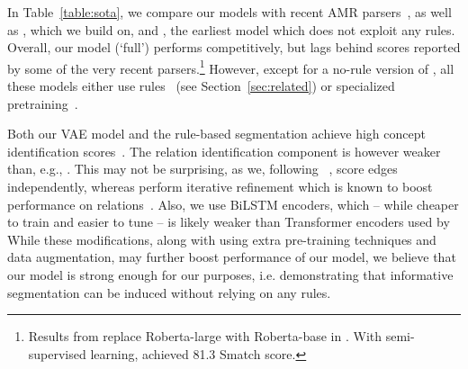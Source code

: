 \documentclass[11pt]{article}
\begin{document}
\vspace{1ex}
   \quad
In Table~\ref{table:sota}, we compare our models with recent AMR parsers~\cite{xu-etal-2020-improving,Cai2020AMRPV,cai-lam-2019-core,Zhang2019AMRPA,Naseem2019RewardingST,Lindemann2020FastSP,Lee2020PushingTL}, as well as \cite{lyu-titov-2018-amr}, which we build on, and \cite{Noord2017NeuralSP}, the earliest model which does not exploit any rules.  Overall, our model (`full') performs competitively, but lags behind scores reported by some of the very recent parsers.\footnote{Results from \citeauthor{Lee2020PushingTL} replace Roberta-large with Roberta-base in \citeauthor{Astudillo2020TransitionbasedPW}. With semi-supervised learning,  achieved 81.3 Smatch score. } However, except for a no-rule version of , all these models either use rules~\cite{Lee2020PushingTL} (see Section~\ref{sec:related}) or specialized pretraining~\cite{xu-etal-2020-improving}. 

 
Both our VAE model and the rule-based segmentation achieve high concept identification scores~\cite{Damonte2017AnIP}.
The relation identification component is however weaker than, e.g., \cite{Cai2020AMRPV}. This may not be surprising, as  we, following ~, score edges independently, whereas \cite{Cai2020AMRPV} perform iterative refinement which is known to boost performance on relations~\cite{lyu-etal-2019-semantic}.  Also, we use BiLSTM encoders, which -- while cheaper to train and easier to tune --
is likely weaker than Transformer encoders used by \citeauthor{Astudillo2020TransitionbasedPW,Lee2020PushingTL} 
While these modifications, along with using extra pre-training techniques and data augmentation, may further boost performance of our model, we believe that our model is strong enough for our purposes, i.e. demonstrating that informative segmentation can be induced without relying on any rules.
\end{document}
